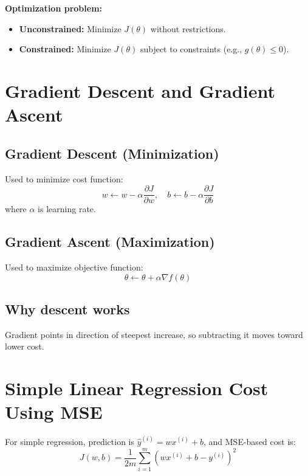 \documentclass[12pt,a4paper]{article}
\begin{document}
\textbf{Optimization problem:}
\begin{itemize}[noitemsep]
    \item \textbf{Unconstrained:} Minimize $J(\theta)$ without restrictions.
    \item \textbf{Constrained:} Minimize $J(\theta)$ subject to constraints (e.g., $g(\theta) \le 0$).
\end{itemize}

\section{\textcolor{primary}{Gradient Descent and Gradient Ascent}}

\subsection*{Gradient Descent (Minimization)}
Used to minimize cost function:
\begin{equation}
w \leftarrow w - \alpha \frac{\partial J}{\partial w}, \quad b \leftarrow b - \alpha \frac{\partial J}{\partial b}
\end{equation}
where $\alpha$ is learning rate.

\subsection*{Gradient Ascent (Maximization)}
Used to maximize objective function:
\begin{equation}
\theta \leftarrow \theta + \alpha \nabla f(\theta)
\end{equation}

\subsection*{Why descent works}
Gradient points in direction of steepest increase, so subtracting it moves toward lower cost.

\section{\textcolor{primary}{Simple Linear Regression Cost Using MSE}}

For simple regression, prediction is $\hat{y}^{(i)} = wx^{(i)} + b$, and MSE-based cost is:
\begin{equation}
J(w,b) = \frac{1}{2m}\sum_{i=1}^{m}(wx^{(i)} + b - y^{(i)})^2
\end{equation}
\end{document}
